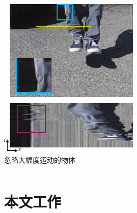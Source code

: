 \documentclass[xcolor=svgnames,serif,table,10pt]{beamer}
\begin{document}
\begin{frame}
\begin{columns}
\begin{minipage}{0.7\textwidth}
      \includegraphics[width=\textwidth]{ignore2.pdf}\\
      忽略大幅度运动的物体
    \end{minipage}
  \end{columns}
\end{frame}

\section{本文工作}
\end{document}
